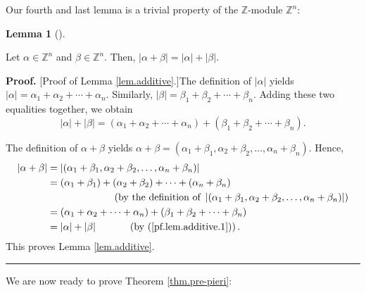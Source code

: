 \documentclass[numbers=enddot,12pt,final,onecolumn,notitlepage,english]{scrartcl}%
\theoremstyle{definition}
\newtheorem{lem}[theo]{Lemma}
\newenvironment{lemma}[1][]
{\begin{lem}[#1]\begin{leftbar}}
{\end{leftbar}\end{lem}}
\newenvironment{proof}[1][Proof]{\noindent\textbf{#1.} }{\ \rule{0.5em}{0.5em}}
\newenvironment{verlong}{}{}
\begin{document}
Our fourth and last lemma is a trivial property of the $\mathbb{Z}$-module
$\mathbb{Z}^{n}$:

\begin{lemma}
\label{lem.additive}Let $\alpha\in\mathbb{Z}^{n}$ and $\beta\in\mathbb{Z}^{n}%
$. Then, $\left\vert \alpha+\beta\right\vert =\left\vert \alpha\right\vert
+\left\vert \beta\right\vert $.
\end{lemma}

\begin{verlong}
\begin{proof}
[Proof of Lemma \ref{lem.additive}.]The definition of $\left\vert
\alpha\right\vert $ yields $\left\vert \alpha\right\vert =\alpha_{1}%
+\alpha_{2}+\cdots+\alpha_{n}$. Similarly, $\left\vert \beta\right\vert
=\beta_{1}+\beta_{2}+\cdots+\beta_{n}$. Adding these two equalities together,
we obtain%
\begin{equation}
\left\vert \alpha\right\vert +\left\vert \beta\right\vert =\left(  \alpha
_{1}+\alpha_{2}+\cdots+\alpha_{n}\right)  +\left(  \beta_{1}+\beta_{2}%
+\cdots+\beta_{n}\right)  . \label{pf.lem.additive.1}%
\end{equation}


The definition of $\alpha+\beta$ yields $\alpha+\beta=\left(  \alpha_{1}%
+\beta_{1},\alpha_{2}+\beta_{2},\ldots,\alpha_{n}+\beta_{n}\right)  $. Hence,%
\begin{align*}
\left\vert \alpha+\beta\right\vert  &  =\left\vert \left(  \alpha_{1}%
+\beta_{1},\alpha_{2}+\beta_{2},\ldots,\alpha_{n}+\beta_{n}\right)
\right\vert \\
&  =\left(  \alpha_{1}+\beta_{1}\right)  +\left(  \alpha_{2}+\beta_{2}\right)
+\cdots+\left(  \alpha_{n}+\beta_{n}\right) \\
&  \ \ \ \ \ \ \ \ \ \ \ \ \ \ \ \ \ \ \ \ \left(  \text{by the definition of
}\left\vert \left(  \alpha_{1}+\beta_{1},\alpha_{2}+\beta_{2},\ldots
,\alpha_{n}+\beta_{n}\right)  \right\vert \right) \\
&  =\left(  \alpha_{1}+\alpha_{2}+\cdots+\alpha_{n}\right)  +\left(  \beta
_{1}+\beta_{2}+\cdots+\beta_{n}\right) \\
&  =\left\vert \alpha\right\vert +\left\vert \beta\right\vert
\ \ \ \ \ \ \ \ \ \ \left(  \text{by (\ref{pf.lem.additive.1})}\right)  .
\end{align*}
This proves Lemma \ref{lem.additive}.
\end{proof}
\end{verlong}

We are now ready to prove Theorem \ref{thm.pre-pieri}:
\end{document}
